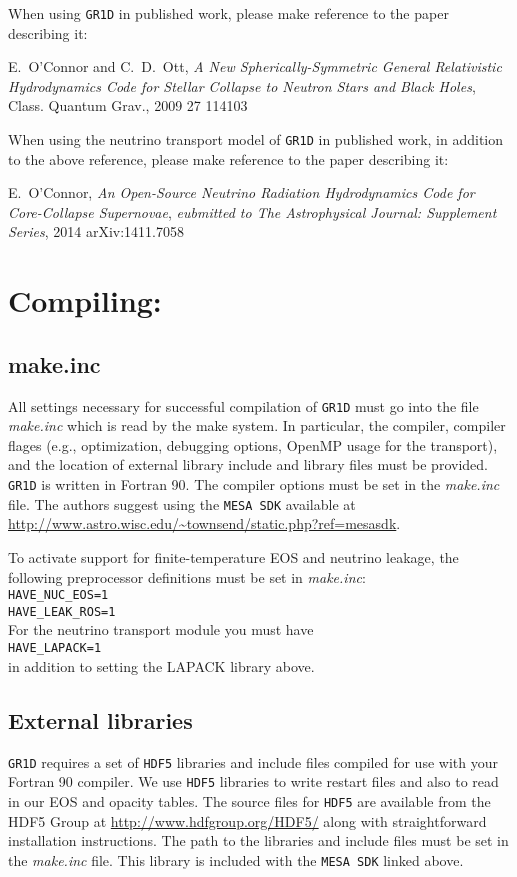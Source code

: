 \documentclass[10pt,nofootinbib]{article}
\newcommand{\code}[1]{\texttt{#1}}
\begin{document}
When using \code{GR1D} in published work, please make reference
to the paper describing it:

\hspace{2cm}\parbox{12cm}{E.\ O'Connor and C.\ D.\ Ott, \emph{A New Spherically-Symmetric
General Relativistic Hydrodynamics Code for Stellar Collapse to Neutron
Stars and Black Holes}, Class. Quantum Grav., 2009 27 114103}

When using the neutrino transport model of \code{GR1D} in published
work, in addition to the above reference, please make reference to
the paper describing it:

\hspace{2cm}\parbox{12cm}{E.\ O'Connor, \emph{An Open-Source Neutrino
    Radiation Hydrodynamics Code for Core-Collapse Supernovae},
  \emph{eubmitted to The Astrophysical Journal: Supplement Series},
  2014 arXiv:1411.7058}

\section{Compiling:}
\subsection{make.inc}
All settings necessary for successful compilation of \code{GR1D} must
go into the file {\emph{make.inc}} which is read by the make
system. In particular, the compiler, compiler flages (e.g.,
optimization, debugging options, OpenMP usage for the transport), and
the location of external library include and library files must be
provided. \code{GR1D} is written in Fortran 90.  The compiler options
must be set in the {\it make.inc} file. The authors suggest using the
\code{MESA SDK} available at
\url{http://www.astro.wisc.edu/~townsend/static.php?ref=mesasdk}.

To activate support for finite-temperature EOS and neutrino leakage,
the following preprocessor definitions must be set in \emph{make.inc}:\\
{\tt HAVE\_NUC\_EOS=1}\\
{\tt HAVE\_LEAK\_ROS=1}\\
For the neutrino transport module you must have\\
{\tt HAVE\_LAPACK=1}\\
in addition to setting the LAPACK library above.

\subsection{External libraries}
\code{GR1D} requires a set of \code{HDF5} libraries and include files
compiled for use with your Fortran 90 compiler.  We use \code{HDF5}
libraries to write restart files and also to read in our EOS and
opacity tables.  The source files for \code{HDF5} are available from
the HDF5 Group at \url{http://www.hdfgroup.org/HDF5/} along with
straightforward installation instructions.  The path to the libraries
and include files must be set in the {\it make.inc} file.  This
library is included with the \code{MESA SDK} linked above.
\end{document}

